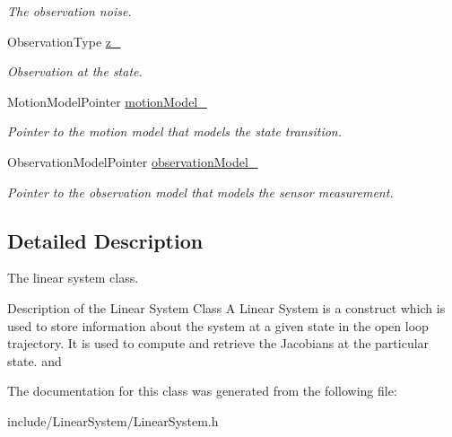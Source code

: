 \begin{DoxyCompactItemize}
\begin{DoxyCompactList}\small\item\em \-The observation noise. \end{DoxyCompactList}\item 
\hypertarget{class_linear_system_a8d402083ec5c55357a11ec8e780bcf20}{\-Observation\-Type \hyperlink{class_linear_system_a8d402083ec5c55357a11ec8e780bcf20}{z\-\_\-}}\label{class_linear_system_a8d402083ec5c55357a11ec8e780bcf20}

\begin{DoxyCompactList}\small\item\em \-Observation at the state. \end{DoxyCompactList}\item 
\hypertarget{class_linear_system_a6ae00f368bfa21a8dfe0d6855bfc1322}{\-Motion\-Model\-Pointer \hyperlink{class_linear_system_a6ae00f368bfa21a8dfe0d6855bfc1322}{motion\-Model\-\_\-}}\label{class_linear_system_a6ae00f368bfa21a8dfe0d6855bfc1322}

\begin{DoxyCompactList}\small\item\em \-Pointer to the motion model that models the state transition. \end{DoxyCompactList}\item 
\hypertarget{class_linear_system_a6aacc355010106de6f65f66c8dfa301b}{\-Observation\-Model\-Pointer \hyperlink{class_linear_system_a6aacc355010106de6f65f66c8dfa301b}{observation\-Model\-\_\-}}\label{class_linear_system_a6aacc355010106de6f65f66c8dfa301b}

\begin{DoxyCompactList}\small\item\em \-Pointer to the observation model that models the sensor measurement. \end{DoxyCompactList}\end{DoxyCompactItemize}


\subsection{\-Detailed \-Description}
\-The linear system class. 

\begin{DoxyParagraph}{\-Description of the \-Linear \-System \-Class}
\-A \-Linear \-System is a construct which is used to store information about the system at a given state in the open loop trajectory. \-It is used to compute and retrieve the \-Jacobians at the particular state. and 
\end{DoxyParagraph}


\-The documentation for this class was generated from the following file\-:\begin{DoxyCompactItemize}
\item 
include/\-Linear\-System/\-Linear\-System.\-h\end{DoxyCompactItemize}
